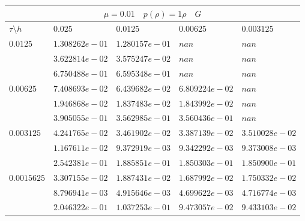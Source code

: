 \documentclass[a4paper,12pt]{extarticle}
\begin{document}
\begin{tabular}{|l|l|l|l|l|}
	\hline
	\multicolumn{5}{|c|}{$\mu =0.01 \quad  p(\rho) =1 \rho \quad G$}\\
	\hline
	$\tau\setminus h$ & $0.025$ & $0.0125$ & $0.00625$ & $0.003125$\\
	\hline
	$0.0125$  & $1.308262e-01$ & $1.280157e-01$ & $nan$ & $nan$\\
	& $3.622814e-02$ & $3.575247e-02$ & $nan$ & $nan$\\
	& $6.750488e-01$ & $6.595348e-01$ & $nan$ & $nan$\\
	\hline
	$0.00625$  & $7.408693e-02$ & $6.439682e-02$ & $6.809224e-02$ & $nan$\\
	& $1.946868e-02$ & $1.837483e-02$ & $1.843992e-02$ & $nan$\\
	& $3.905055e-01$ & $3.562985e-01$ & $3.560436e-01$ & $nan$\\
	\hline
	$0.003125$  & $4.241765e-02$ & $3.461902e-02$ & $3.387139e-02$ & $3.510028e-02$\\
	& $1.167611e-02$ & $9.372919e-03$ & $9.342292e-03$ & $9.373008e-03$\\
	& $2.542381e-01$ & $1.885851e-01$ & $1.850303e-01$ & $1.850900e-01$\\
	\hline
	$0.0015625$  & $3.307155e-02$ & $1.887431e-02$ & $1.687992e-02$ & $1.750332e-02$\\
	& $8.796941e-03$ & $4.915646e-03$ & $4.699622e-03$ & $4.716774e-03$\\
	& $2.046322e-01$ & $1.037253e-01$ & $9.473057e-02$ & $9.433103e-02$\\
	\hline
\end{tabular}
\end{document}
